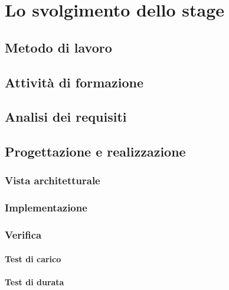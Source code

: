 
\chapter{Lo svolgimento dello stage}
\label{cap:svolgimento-stage}
\vspace{20pt}
\section{Metodo di lavoro}
 
\section{Attività di formazione}

\section{Analisi dei requisiti}

\section{Progettazione e realizzazione}

\subsection{Vista architetturale}

\subsection{Implementazione}

\subsection{Verifica}

\subsubsection{Test di carico}
\subsubsection{Test di durata}



